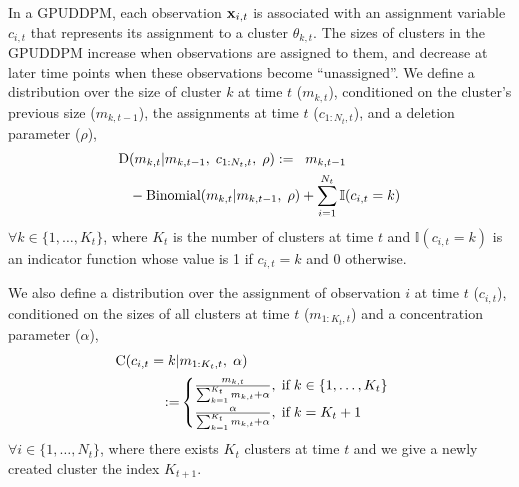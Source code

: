 \documentclass[twocolumn, final]{svjour3}
\begin{document}
In a GPUDDPM, each observation $\bold{x}_{i,t}$ is associated with an assignment variable $c_{i,t}$ that represents its assignment to a cluster $\theta_{k,t}$.
The sizes of clusters in the GPUDDPM increase when observations are assigned to them, and decrease at later time points when these observations become ``unassigned''. We define a distribution over the size of cluster $k$ at time $t$ ($m_{k,t}$), conditioned on the cluster's previous size ($m_{k,t-1}$), the assignments at time $t$ ($c_{1:N_{t}, t}$), and a deletion parameter ($\rho$),
\begin{equation}
\begin{split}
\label{D_distro}
\text{D} &(m_{k,t} | m_{k,t-1}, \hspace{1mm} c_{1:N_{t}, t}, \hspace{1mm} \rho) := \hspace{2mm} m_{k,t-1} \\
&- \text{Binomial}( m_{k,t} | {m_{k,t-1}, \hspace{1mm} \rho}) + \sum_{i=1}^{N_{t}} \mathbb{I}(c_{i,t} = k)
\end{split}
\end{equation}
$\forall k \in \{1, \ldots, K_{t} \}$, where $K_{t}$ is the number of clusters at time $t$ and $\mathbb{I}(c_{i,t} = k)$ is an indicator function whose value is 1 if $c_{i,t} = k$ and 0 otherwise.

We also define a distribution over the assignment of observation $i$ at time $t$ ($c_{i,t}$), conditioned on the sizes of all clusters at time $t$ ($m_{1:K_{t},t}$) and a concentration parameter ($\alpha$),
\begin{equation}
\begin{split}
\label{C_distro}
\text{C} ( c_{i,t} = k | &m_{1:K_{t},t}, \hspace{1mm} \alpha)\\ :=
& \begin{cases}
\frac{m_{k,t}}{\sum_{k=1}^{K_{t}} m_{k,t} + \alpha}, \hspace{1mm} \text{if} \hspace{1mm} k \in \{ 1, \ldots, K_{t} \} \\
\frac{\alpha}{\sum_{k=1}^{K_{t}} m_{k,t} + \alpha}, \hspace{1mm} \text{if} \hspace{1mm} k = K_{t} + 1
\end{cases}
\end{split}
\end{equation}
$\forall i \in \{1, \ldots, N_{t} \}$, where there exists $K_{t}$ clusters at time $t$ and we give a newly created cluster the index $K_{t+1}$.
\end{document}
